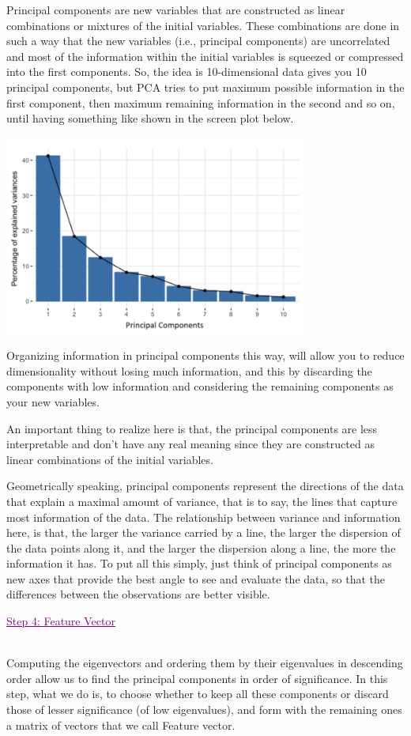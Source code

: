 Principal components are new variables that are constructed as linear combinations or mixtures of the initial variables. These combinations are done in such a way that the new variables (i.e., principal components) are uncorrelated and most of the information within the initial variables is squeezed or compressed into the first components. So, the idea is 10-dimensional data gives you 10 principal components, but PCA tries to put maximum possible information in the first component, then maximum remaining information in the second and so on, until having something like shown in the screen plot below.
\centerline{\includegraphics[width=100mm,scale=1]{A5_img1.PNG}}
Organizing information in principal components this way, will allow you to reduce dimensionality without losing much information, and this by discarding the components with low information and considering the remaining components as your new variables.

An important thing to realize here is that, the principal components are less interpretable and don’t have any real meaning since they are constructed as linear combinations of the initial variables.

Geometrically speaking, principal components represent the directions of the data that explain a maximal amount of variance, that is to say, the lines that capture most information of the data. The relationship between variance and information here, is that, the larger the variance carried by a line, the larger the dispersion of the data points along it, and the larger the dispersion along a line, the more the information it has. To put all this simply, just think of principal components as new axes that provide the best angle to see and evaluate the data, so that the differences between the observations are better visible. \\[0.2 cm]
\textcolor{purple}{\centerline{\underline{{ Step 4: Feature Vector }}}}\\[0.2 cm]
Computing the eigenvectors and ordering them by their eigenvalues in descending order allow us to find the principal components in order of significance. In this step, what we do is, to choose whether to keep all these components or discard those of lesser significance (of low eigenvalues), and form with the remaining ones a matrix of vectors that we call Feature vector.

